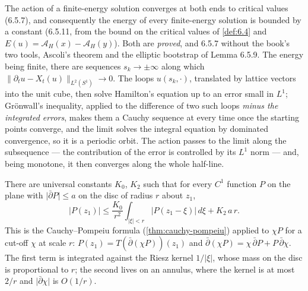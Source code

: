 \begin{proposition}
  \label{prop:6.5.7}
  \leanok
  The action of a finite-energy solution converges at both ends to critical
  values (6.5.7), and consequently the energy of every finite-energy solution is
  bounded by a constant (6.5.11, from the bound on the critical values of
  \ref{def:6.4} and $E(u) = \mathcal{A}_H(x) - \mathcal{A}_H(y)$).  Both are
  \emph{proved}, and 6.5.7 without the book's two tools, Ascoli's theorem and
  the elliptic bootstrap of Lemma 6.5.9.  The energy being finite, there are
  sequences $s_k \to \pm\infty$ along which
  $\lVert \partial_t u - X_t(u)\rVert_{L^2(S^1)} \to 0$.  The loops
  $u(s_k,\cdot)$, translated by lattice vectors into the unit cube, then solve
  Hamilton's equation up to an error small in $L^1$; Gr\"onwall's inequality,
  applied to the difference of two such loops \emph{minus the integrated
  errors}, makes them a Cauchy sequence at every time once the starting points
  converge, and the limit solves the integral equation by dominated convergence,
  so it is a periodic orbit.  The action passes to the limit along the
  subsequence --- the contribution of the error is controlled by its $L^1$ norm
  --- and, being monotone, it then converges along the whole half-line.
\end{proposition}

\begin{lemma}
  \label{lem:mean-value}
  \leanok
  There are universal constants $K_0$, $K_2$ such that for every $C^1$ function
  $P$ on the plane with $\lvert\bar\partial P\rvert \le a$ on the disc of radius
  $r$ about $z_1$,
  \[\lvert P(z_1)\rvert \le \frac{K_0}{r^2}\int_{\lvert\xi\rvert<r}
    \lvert P(z_1-\xi)\rvert\,d\xi + K_2\,a\,r.\]
  This is the Cauchy--Pompeiu formula (\ref{thm:cauchy-pompeiu}) applied to
  $\chi P$ for a cut-off $\chi$ at scale $r$: $P(z_1) = T(\bar\partial(\chi P))(z_1)$
  and $\bar\partial(\chi P) = \chi\,\bar\partial P + P\,\bar\partial\chi$.  The first
  term is integrated against the Riesz kernel $1/\lvert\xi\rvert$, whose mass on
  the disc is proportional to $r$; the second lives on an annulus, where the
  kernel is at most $2/r$ and $\lvert\bar\partial\chi\rvert$ is $O(1/r)$.
\end{lemma}

